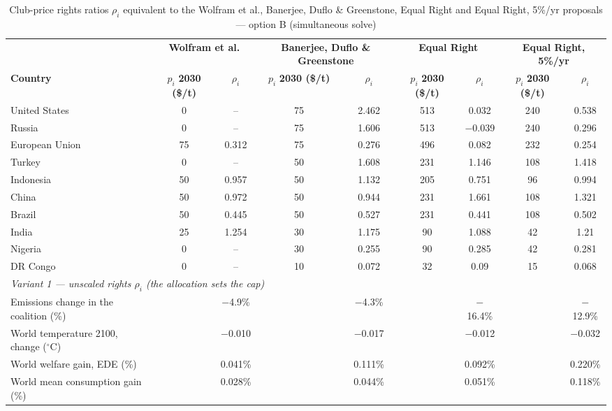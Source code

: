 \begin{table}[htbp]
\centering
\small
\caption{Club-price rights ratios $\rho_i$ equivalent to the Wolfram et al., Banerjee, Duflo \& Greenstone, Equal Right and Equal Right, 5\%/yr proposals --- option B (simultaneous solve)}
\renewcommand{\arraystretch}{1.15}
\begin{tabular}{lcccccccc}
  \toprule
  & \multicolumn{2}{c}{\textbf{Wolfram et al.}} & \multicolumn{2}{c}{\textbf{Banerjee, Duflo \& Greenstone}} & \multicolumn{2}{c}{\textbf{Equal Right}} & \multicolumn{2}{c}{\textbf{Equal Right, 5\%/yr}} \\
  \cmidrule(lr){2-3} \cmidrule(lr){4-5} \cmidrule(lr){6-7} \cmidrule(lr){8-9}
  \textbf{Country} & $p_i$ \textbf{2030 (\$/t)} & $\rho_i$ & $p_i$ \textbf{2030 (\$/t)} & $\rho_i$ & $p_i$ \textbf{2030 (\$/t)} & $\rho_i$ & $p_i$ \textbf{2030 (\$/t)} & $\rho_i$ \\
  \midrule
  United States & 0 & -- & 75 & 2.462 & 513 & 0.032 & 240 & 0.538 \\
  Russia & 0 & -- & 75 & 1.606 & 513 & $-$0.039 & 240 & 0.296 \\
  European Union & 75 & 0.312 & 75 & 0.276 & 496 & 0.082 & 232 & 0.254 \\
  Turkey & 0 & -- & 50 & 1.608 & 231 & 1.146 & 108 & 1.418 \\
  Indonesia & 50 & 0.957 & 50 & 1.132 & 205 & 0.751 & 96 & 0.994 \\
  China & 50 & 0.972 & 50 & 0.944 & 231 & 1.661 & 108 & 1.321 \\
  Brazil & 50 & 0.445 & 50 & 0.527 & 231 & 0.441 & 108 & 0.502 \\
  India & 25 & 1.254 & 30 & 1.175 & 90 & 1.088 & 42 & 1.21 \\
  Nigeria & 0 & -- & 30 & 0.255 & 90 & 0.285 & 42 & 0.281 \\
  DR Congo & 0 & -- & 10 & 0.072 & 32 & 0.09 & 15 & 0.068 \\
  \midrule
  \multicolumn{9}{l}{\textit{Variant 1 --- unscaled rights $\rho_i$ (the allocation sets the cap)}} \\
  \quad Emissions change in the coalition (\%) &  & $-$4.9\% &  & $-$4.3\% &  & $-$16.4\% &  & $-$12.9\% \\
  \quad World temperature 2100, change ($^\circ$C) &  & $-$0.010 &  & $-$0.017 &  & $-$0.012 &  & $-$0.032 \\
  \quad World welfare gain, EDE (\%) &  & 0.041\% &  & 0.111\% &  & 0.092\% &  & 0.220\% \\
  \quad World mean consumption gain (\%) &  & 0.028\% &  & 0.044\% &  & 0.051\% &  & 0.118\% \\

\end{tabular}
\end{table}
